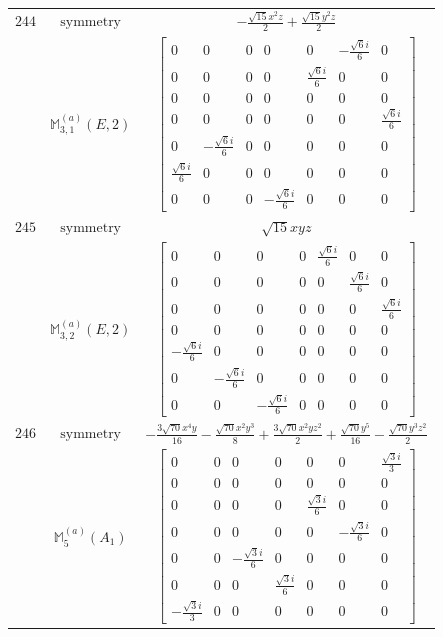 \documentclass[fleqn,8pt,landscape]{jsarticle}
\begin{document}
\begin{longtable}{ccc}
$ 244 $ & $ \text{symmetry} $ & $ - \frac{\sqrt{15} x^{2} z}{2} + \frac{\sqrt{15} y^{2} z}{2} $ \\
$  $ & $ \mathbb{M}_{3,1}^{(a)}(E,2) $ & $ \begin{bmatrix} 0 & 0 & 0 & 0 & 0 & - \frac{\sqrt{6} i}{6} & 0 \\ 0 & 0 & 0 & 0 & \frac{\sqrt{6} i}{6} & 0 & 0 \\ 0 & 0 & 0 & 0 & 0 & 0 & 0 \\ 0 & 0 & 0 & 0 & 0 & 0 & \frac{\sqrt{6} i}{6} \\ 0 & - \frac{\sqrt{6} i}{6} & 0 & 0 & 0 & 0 & 0 \\ \frac{\sqrt{6} i}{6} & 0 & 0 & 0 & 0 & 0 & 0 \\ 0 & 0 & 0 & - \frac{\sqrt{6} i}{6} & 0 & 0 & 0 \end{bmatrix} $ \\ \hline
$ 245 $ & $ \text{symmetry} $ & $ \sqrt{15} x y z $ \\
$  $ & $ \mathbb{M}_{3,2}^{(a)}(E,2) $ & $ \begin{bmatrix} 0 & 0 & 0 & 0 & \frac{\sqrt{6} i}{6} & 0 & 0 \\ 0 & 0 & 0 & 0 & 0 & \frac{\sqrt{6} i}{6} & 0 \\ 0 & 0 & 0 & 0 & 0 & 0 & \frac{\sqrt{6} i}{6} \\ 0 & 0 & 0 & 0 & 0 & 0 & 0 \\ - \frac{\sqrt{6} i}{6} & 0 & 0 & 0 & 0 & 0 & 0 \\ 0 & - \frac{\sqrt{6} i}{6} & 0 & 0 & 0 & 0 & 0 \\ 0 & 0 & - \frac{\sqrt{6} i}{6} & 0 & 0 & 0 & 0 \end{bmatrix} $ \\ \hline
$ 246 $ & $ \text{symmetry} $ & $ - \frac{3 \sqrt{70} x^{4} y}{16} - \frac{\sqrt{70} x^{2} y^{3}}{8} + \frac{3 \sqrt{70} x^{2} y z^{2}}{2} + \frac{\sqrt{70} y^{5}}{16} - \frac{\sqrt{70} y^{3} z^{2}}{2} $ \\
$  $ & $ \mathbb{M}_{5}^{(a)}(A_{1}) $ & $ \begin{bmatrix} 0 & 0 & 0 & 0 & 0 & 0 & \frac{\sqrt{3} i}{3} \\ 0 & 0 & 0 & 0 & 0 & 0 & 0 \\ 0 & 0 & 0 & 0 & \frac{\sqrt{3} i}{6} & 0 & 0 \\ 0 & 0 & 0 & 0 & 0 & - \frac{\sqrt{3} i}{6} & 0 \\ 0 & 0 & - \frac{\sqrt{3} i}{6} & 0 & 0 & 0 & 0 \\ 0 & 0 & 0 & \frac{\sqrt{3} i}{6} & 0 & 0 & 0 \\ - \frac{\sqrt{3} i}{3} & 0 & 0 & 0 & 0 & 0 & 0 \end{bmatrix} $ \\ \hline

\end{longtable}
\end{document}
